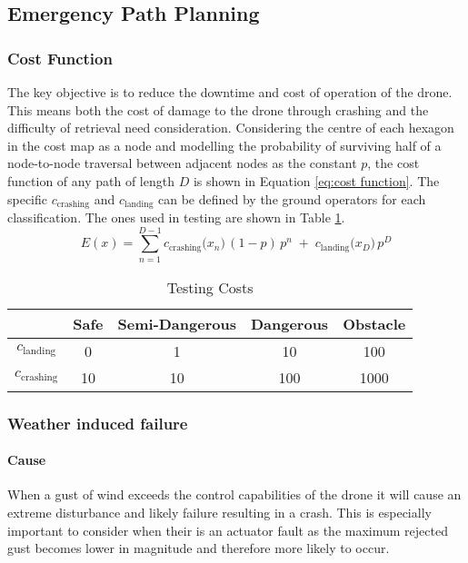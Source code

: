 \subsection{Emergency Path Planning}\label{sub_section:tgt_path_planning}

\subsubsection{Cost Function}\label{sub_sub_section:tgt_cost_function}
The key objective is to reduce the downtime and cost of operation of the drone. This means both the cost of damage to the drone through crashing and the difficulty of retrieval need consideration. Considering the centre of each hexagon in the cost map as a node and modelling the probability of surviving half of a node-to-node traversal between adjacent nodes as the constant $p$, the cost function of any path of length $D$ is shown in Equation \ref{eq:cost function}. The specific $c_{\text{crashing}}$ and $c_{\text{landing}}$ can be defined by the ground operators for each classification. The ones used in testing are shown in Table \ref{tab:cost_values}.
\begin{equation}\label{eq:cost function}
    E(x) 
    = \sum_{n=1}^{D-1} c_{\text{crashing}}\bigl(x_n\bigr)\, (1-p) \,p^n 
    \;+\; c_{\text{landing}}\bigl(x_D\bigr)\, p^D
\end{equation}
\begin{table}[h]
    \centering
    \begin{tabular}{|c|c|c|c|c|}
    \hline
         \textbf{} & \textbf{Safe} & \textbf{Semi-Dangerous} & \textbf{Dangerous} & \textbf{Obstacle} \\
         \hline
         $c_{\text{landing}}$ & 0 & 1 & 10 & 100 \\
         $c_{\text{crashing}}$ & 10 & 10 & 100 & 1000\\
         \hline
    \end{tabular}
    \caption{Testing Costs}
    \label{tab:cost_values}
\end{table}

\subsubsection{Weather induced failure}\label{sub_sub_section:tgt_weather_failure}
\paragraph{Cause}
When a gust of wind exceeds the control capabilities of the drone it will cause an extreme disturbance and likely failure resulting in a crash. This is especially important to consider when their is an actuator fault as the maximum rejected gust becomes lower in magnitude and therefore more likely to occur.
